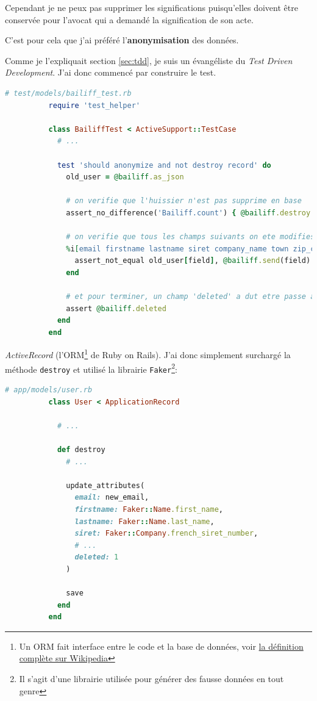 \documentclass[]{report}
\begin{document}
        Cependant je ne peux pas supprimer les significations puisqu'elles doivent être conservée pour l'avocat qui a demandé la signification de son acte.

        C'est pour cela que j'ai préféré l'\textbf{anonymisation} des données.

        Comme je l'expliquait section \ref{sec:tdd}, je suis un évangéliste du \textit{Test Driven Development}. J'ai donc commencé par construire le test.

        \begin{scriptsize}
          \begin{lstlisting}[language=ruby]
          # test/models/bailiff_test.rb
          require 'test_helper'

          class BailiffTest < ActiveSupport::TestCase
            # ...

            test 'should anonymize and not destroy record' do
              old_user = @bailiff.as_json

              # on verifie que l'huissier n'est pas supprime en base
              assert_no_difference('Bailiff.count') { @bailiff.destroy }

              # on verifie que tous les champs suivants on ete modifies
              %i[email firstname lastname siret company_name town zip_code address_2 address_1].each do |field|
                assert_not_equal old_user[field], @bailiff.send(field)
              end

              # et pour terminer, un champ 'deleted' a dut etre passe a 'true'
              assert @bailiff.deleted
            end
          end
          \end{lstlisting}
        \end{scriptsize}


        \textit{ActiveRecord} (l'ORM\footnote{Un ORM fait interface entre le code et la base de données, voir \href{https://fr.wikipedia.org/wiki/Mapping_objet-relationnel}{la définition complète sur Wikipedia}} de Ruby on Rails). J'ai donc simplement surchargé la méthode \verb|destroy| et utilisé la librairie \verb|Faker|\footnote{Il s'agit d'une librairie utilisée pour générer des fausse données en tout genre}:

        \begin{scriptsize}
          \begin{lstlisting}[language=ruby]
          # app/models/user.rb
          class User < ApplicationRecord

            # ...

            def destroy
              # ...

              update_attributes(
                email: new_email,
                firstname: Faker::Name.first_name,
                lastname: Faker::Name.last_name,
                siret: Faker::Company.french_siret_number,
                # ...
                deleted: 1
              )

              save
            end
          end
          \end{lstlisting}
        \end{scriptsize}
\end{document}
